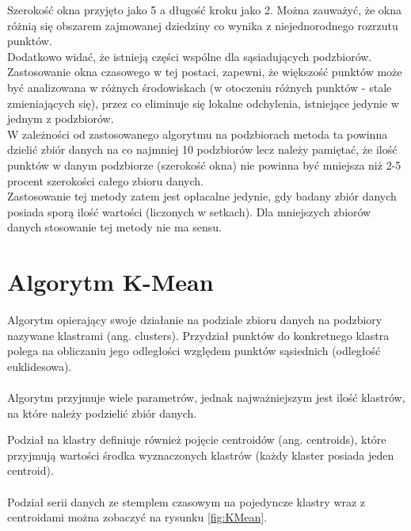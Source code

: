 \documentclass[eng,printmode]{mgr}
\begin{document}
Szerokość okna przyjęto jako 5 a długość kroku jako 2. Można zauważyć, że okna różnią się obszarem zajmowanej dziedziny co wynika z niejednorodnego rozrzutu punktów.
\\
Dodatkowo widać, że istnieją części wspólne dla sąsiadujących podzbiorów. Zastosowanie okna czasowego w tej postaci, zapewni, że większość punktów może być analizowana w różnych środowiskach (w otoczeniu różnych punktów - stale zmieniających się), przez co eliminuje się lokalne odchylenia, istniejące jedynie w jednym z podzbiorów.
\\
W zależności od zastosowanego algorytmu na podzbiorach metoda ta powinna dzielić zbiór danych na co najmniej 10 podzbiorów lecz należy pamiętać, że ilość punktów w danym podzbiorze (szerokość okna) nie powinna być mniejsza niż 2-5 procent szerokości całego zbioru danych.
\\
Zastosowanie tej metody zatem jest opłacalne jedynie, gdy badany zbiór danych posiada sporą ilość wartości (liczonych w setkach). Dla mniejszych zbiorów danych stosowanie tej metody nie ma sensu. 

\section{Algorytm K-Mean}
\label{sec:kmean}
Algorytm opierający swoje działanie na podziale zbioru danych na podzbiory nazywane klastrami (ang. clusters). Przydział punktów do konkretnego klastra polega na obliczaniu jego odległości względem punktów sąsiednich (odległość euklidesowa). \\ \\
Algorytm przyjmuje wiele parametrów, jednak najważniejszym jest ilość klastrów, na które należy podzielić zbiór danych.

Podział na klastry definiuje również pojęcie centroidów (ang. centroids), które przyjmują wartości środka wyznaczonych klastrów (każdy klaster posiada jeden centroid). \\ \\

Podział serii danych ze stemplem czasowym na pojedyncze klastry wraz z centroidami można zobaczyć na rysunku \ref{fig:KMean}.
\end{document}
